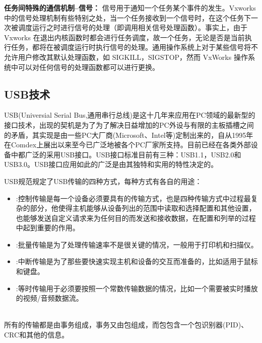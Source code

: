 \textbf{任务间特殊的通信机制--信号：} 信号用于通知一个任务某个事件的发生。Vxworks中的信号处理机制有些特别之处，当一个任务接收到一个信号时，在这个任务下一次被调度运行之时进行信号的处理（即调用相关信号处理函数）。事实上，由于 Vxworks 在退出内核函数时都会进行任务调度，故一个任务，无论是否是当前执行任务，都将在被调度运行时执行信号的处理。通用操作系统上对于某些信号将不允许用户修改其默认处理函数，如 SIGKILL，SIGSTOP，然而 VxWorks 操作系统中可以对任何信号的处理函数都可以进行更换。




\subsection{USB技术}
	USB(Universial Serial Bus,通用串行总线)是这十几年来应用在PC领域的最新型的接口技术，出现的契机是为了为了解决日益增加的PC外设与有限的主板插槽之间的矛盾，其实现是由一些PC大厂商(Microsoft、Intel等)定制出来的，自从1995年在Comdex上展出以来至今已广泛地被各个PC厂家所支持。目前已经在各类外部设备中都广泛的采用USB接口。USB接口标准目前有三种：USB1.1，USB2.0和USB3.0。USB接口应用如此的广泛是由其独特和实用的特性决定的。

\noindent USB规范规定了USB传输的四种方式，每种方式有各自的用途\cite{USB总线接口开发指南}：
\begin{itemize}
\item {}:控制传输是每一个设备必须要具有的传输方式，也是四种传输方式中过程最复杂的部分，他使得主机能够从设备列出的范围中读取和选择配置和其他设置，也能够发送自定义请求来为任何目的而发送和接收数据，在配置和列举的过程中起到重要的作用。
\item {}:批量传输是为了处理传输速率不是很关键的情况，一般用于打印机和扫描仪。
\item {}:中断传输是为了那些要快速实现主机和设备的交互而准备的，比如适用于鼠标和键盘。
\item {}:等时传输用于必须要按照一个常数传输数据的情况，比如一个需要被实时播放的视频/音频数据流。
\end{itemize}\\
所有的传输都是由事务组成，事务又由包组成，而包包含一个包识别器(PID)、CRC和其他的信息\cite{USB大全}。

